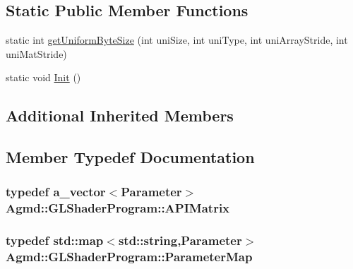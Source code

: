 \subsection*{Static Public Member Functions}
\begin{DoxyCompactItemize}
\item 
static int \hyperlink{class_agmd_1_1_g_l_shader_program_a1b3b1b8eb8e9c43fab0ab01cc34717b8}{get\+Uniform\+Byte\+Size} (int uni\+Size, int uni\+Type, int uni\+Array\+Stride, int uni\+Mat\+Stride)
\item 
static void \hyperlink{class_agmd_1_1_g_l_shader_program_a3df3d47eaea2477175ec047af3d54872}{Init} ()
\end{DoxyCompactItemize}
\subsection*{Additional Inherited Members}


\subsection{Member Typedef Documentation}
\hypertarget{class_agmd_1_1_g_l_shader_program_a525d0f30ae823bbdb21da274dfe639f5}{
\subsubsection[{A\+P\+I\+Matrix}]{\setlength{\rightskip}{0pt plus 5cm}typedef {\bf a\+\_\+vector}$<${\bf Parameter}$>$ {\bf Agmd\+::\+G\+L\+Shader\+Program\+::\+A\+P\+I\+Matrix}}}\label{class_agmd_1_1_g_l_shader_program_a525d0f30ae823bbdb21da274dfe639f5}
\hypertarget{class_agmd_1_1_g_l_shader_program_a42c0063019239509c29c17ec2f41b42e}{
\subsubsection[{Parameter\+Map}]{\setlength{\rightskip}{0pt plus 5cm}typedef std\+::map$<$std\+::string,{\bf Parameter}$>$ {\bf Agmd\+::\+G\+L\+Shader\+Program\+::\+Parameter\+Map}}}\label{class_agmd_1_1_g_l_shader_program_a42c0063019239509c29c17ec2f41b42e}


